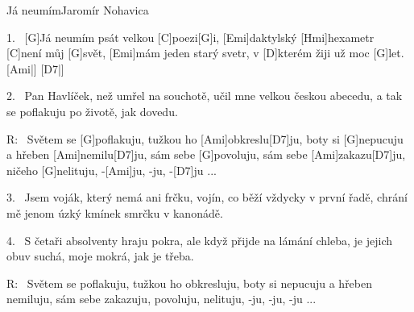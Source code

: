 \begin{song}{Já neumím}{Jaromír Nohavica}

\begin{xverse}{1.~}
[G]Já neumím psát velkou [C]poezi[G]i,
[Emi]daktylský [Hmi]hexametr [C]není můj [G]svět,
[Emi]mám jeden starý svetr, v [D]kterém žiji
už moc [G]let. [Ami|]{} [D7|]{}
\end{xverse}

\begin{xverse}{2.~}
Pan Havlíček, než umřel na souchotě,
učil mne velkou českou abecedu,
a tak se poflakuju po životě,
jak dovedu.
\end{xverse}

\begin{xverse}{R:~}
Světem se [G]poflakuju, tužkou ho [Ami]obkreslu[D7]ju,
boty si [G]nepucuju a hřeben [Ami]nemilu[D7]ju,
sám sebe [G]povoluju, sám sebe [Ami]zakazu[D7]ju,
ničeho [G]nelituju, -[Ami]ju, -ju, -[D7]ju ...
\end{xverse}

\begin{xverse}{3.~}
Jsem voják, který nemá ani frčku,
vojín, co běží vždycky v první řadě,
chrání mě jenom úzký kmínek smrčku
v kanonádě.
\end{xverse}

\begin{xverse}{4.~}
S četaři absolventy hraju pokra,
ale když přijde na lámání chleba,
je jejich obuv suchá, moje mokrá,
jak je třeba.
\end{xverse}

\begin{xverse}{R:~}
Světem se poflakuju, tužkou ho obkresluju,
boty si nepucuju a hřeben nemiluju,
sám sebe zakazuju, povoluju, nelituju, -ju, -ju, -ju ...
\end{xverse}

\end{song}





